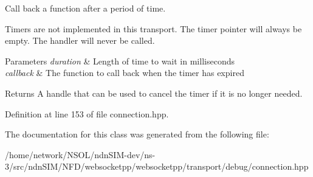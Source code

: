 Call back a function after a period of time. 

Timers are not implemented in this transport. The timer pointer will always be empty. The handler will never be called.


\begin{DoxyParams}{Parameters}
{\em duration} & Length of time to wait in milliseconds \\
\hline
{\em callback} & The function to call back when the timer has expired \\
\hline
\end{DoxyParams}
\begin{DoxyReturn}{Returns}
A handle that can be used to cancel the timer if it is no longer needed. 
\end{DoxyReturn}


Definition at line 153 of file connection.\+hpp.



The documentation for this class was generated from the following file\+:\begin{DoxyCompactItemize}
\item 
/home/network/\+N\+S\+O\+L/ndn\+S\+I\+M-\/dev/ns-\/3/src/ndn\+S\+I\+M/\+N\+F\+D/websocketpp/websocketpp/transport/debug/connection.\+hpp\end{DoxyCompactItemize}
